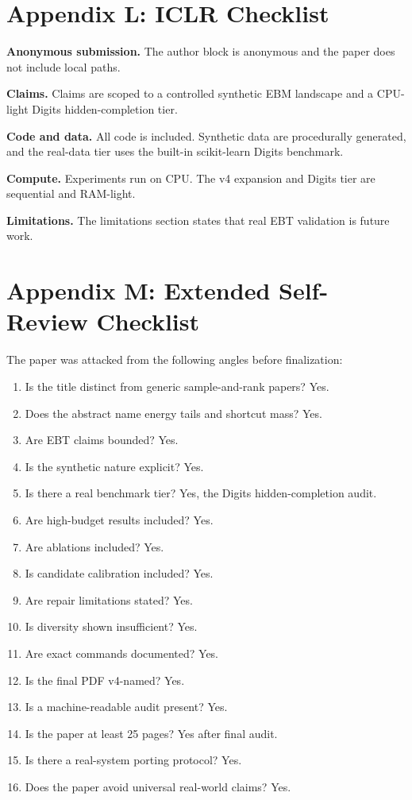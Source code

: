 \documentclass{article}
\begin{document}
\section{Appendix L: ICLR Checklist}

\textbf{Anonymous submission.} The author block is anonymous and the paper does
not include local paths.

\textbf{Claims.} Claims are scoped to a controlled synthetic EBM landscape and
a CPU-light Digits hidden-completion tier.

\textbf{Code and data.} All code is included. Synthetic data are procedurally
generated, and the real-data tier uses the built-in scikit-learn Digits
benchmark.

\textbf{Compute.} Experiments run on CPU. The v4 expansion and Digits tier are
sequential and RAM-light.

\textbf{Limitations.} The limitations section states that real EBT validation
is future work.

\section{Appendix M: Extended Self-Review Checklist}

The paper was attacked from the following angles before finalization:
\begin{enumerate}
  \item Is the title distinct from generic sample-and-rank papers? Yes.
  \item Does the abstract name energy tails and shortcut mass? Yes.
  \item Are EBT claims bounded? Yes.
  \item Is the synthetic nature explicit? Yes.
  \item Is there a real benchmark tier? Yes, the Digits hidden-completion audit.
  \item Are high-budget results included? Yes.
  \item Are ablations included? Yes.
  \item Is candidate calibration included? Yes.
  \item Are repair limitations stated? Yes.
  \item Is diversity shown insufficient? Yes.
  \item Are exact commands documented? Yes.
  \item Is the final PDF v4-named? Yes.
  \item Is a machine-readable audit present? Yes.
  \item Is the paper at least 25 pages? Yes after final audit.
  \item Is there a real-system porting protocol? Yes.
  \item Does the paper avoid universal real-world claims? Yes.
\end{enumerate}
\end{document}
